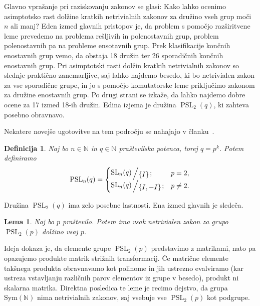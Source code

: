 \documentclass[12pt,a4paper]{article}
\newcounter{theoremcounter}[section] %
\newtheorem{lema}[theoremcounter]{Lema}
\newtheorem{definicija}[theoremcounter]{Definicija}
\newcommand{\quot}[2]{{\raisebox{0.1em}{$#1$}\left/\raisebox{-0.2em}{$#2$}\right.}}
\begin{document}
Glavno vprašanje pri raziskovanju zakonov se glasi: Kako lahko ocenimo asimptotsko rast dolžine kratkih netrivialnih zakonov za družino vseh grup moči $n$ ali manj?
Eden izmed glavnih pristopov je, da problem s pomočjo razširitvene leme prevedemo na problema rešljivih in polenostavnih grup, problem polenostavnih pa na probleme ensotavnih grup.
Prek klasifikacije končnih enostavnih grup vemo, da obstaja 18 družin ter 26 sporadičnih končnih enostavnih grup. Pri asimptotski rasti dolžin kratkih netrivialnih zakonov so slednje praktično zanemarljive, saj lahko
najdemo besedo, ki bo netrivialen zakon za vse sporadične grupe, in jo s pomočjo komutatorske leme priključimo zakonom za družine enostavnih grup. Po drugi strani se izkaže, da lahko najdemo dobre ocene za 17 izmed 18-ih družin.
Edina izjema je družina $\operatorname{PSL}_2(q)$, ki zahteva posebno obravnavo.

\noindent
Nekatere novejše ugotovitve na tem področju se nahajajo v članku~\cite{Bradford_Jakob_Schneider_Thom_2023}.
\begin{definicija}
Naj bo $n \in \mathbb{N}$ in $q \in \mathbb{N}$ praštevilska potenca, torej $q = p^{k}$. Potem definiramo 
\begin{equation*}
            \operatorname{PSL}_n(q) = \begin{cases}
                \quot{\operatorname{SL}_n(q)}{\left\{ I \right\}} ; & p = 2,  \\
                \quot{\operatorname{SL}_n(q)}{\left\{ I, -I \right\} }; & p \neq 2.
            \end{cases}
         \end{equation*}   
\end{definicija}
\noindent
Družina $\operatorname{PSL}_2(q)$ ima zelo posebne lastnosti. Ena izmed glavnih je sledeča. 
\begin{lema}
Naj bo $p$ praštevilo. Potem ima vsak netrivialen zakon za grupo $\operatorname{PSL}_2(p)$ dolžino vsaj $p$.
\end{lema}
\noindent
Ideja dokaza je, da elemente grupe $\operatorname{PSL}_2(p)$ predstavimo z matrikami, nato pa opazujemo produkte matrik strižnih transformacij. Če matrične elemente takšnega produkta obravnavamo kot polinome in jih ustrezno evalviramo (kar ustreza vstavljanju različnih parov elementov iz grupe v besedo), produkt ni skalarna matrika. Direktna posledica te leme je recimo dejstvo, da grupa $\text{Sym}(\mathbb{N})$ nima
netrivialnih zakonov, saj vsebuje vse $\operatorname{PSL}_2(p)$ kot podgrupe.
\end{document}
